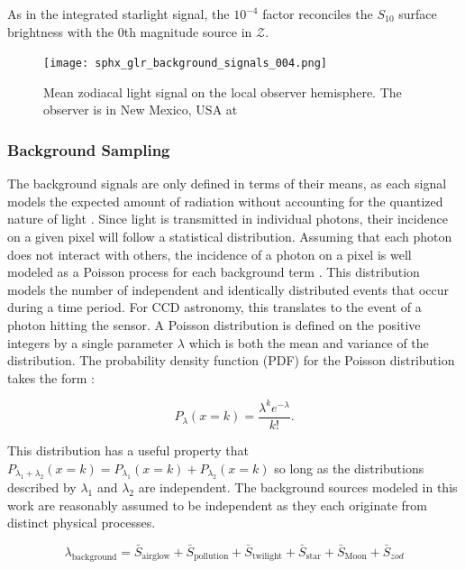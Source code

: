 As in the integrated starlight signal, the $10^{-4}$ factor reconciles the $S_{10}$ surface brightness with the 0th magnitude source in $\mathcal{Z}$. 

\begin{figure}[ht]
  \centering
  \texttt{[image: sphx\_glr\_background\_signals\_004.png]}
  \caption{Mean zodiacal light signal on the local observer hemisphere. The observer is in New Mexico, USA at
  \pogslla}
  \label{fig:zod_hemi}
\end{figure}

\subsubsection{Background Sampling}

The background signals are only defined in terms of their means, as each signal models the expected amount of radiation without accounting for the quantized nature of light \cite{krag2003}. Since light is transmitted in individual photons, their incidence on a given pixel will follow a statistical distribution. Assuming that each photon does not interact with others, the incidence of a photon on a pixel is well modeled as a Poisson process for each background term \cite{frueh2019notes}. This distribution models the number of independent and identically distributed events that occur during a time period. For CCD astronomy, this translates to the event of a photon hitting the sensor. A Poisson distribution is defined on the positive integers by a single parameter $\lambda$ which is both the mean and variance of the distribution. The probability density function (PDF) for the Poisson distribution takes the form \cite{frueh2019notes}:

\begin{equation} \label{eq:poisson_pdf}
  P_\lambda(x=k) = \frac{\lambda^k e^{-\lambda}}{k!}.
\end{equation}

This distribution has a useful property that $P_{\lambda_1 + \lambda_2}(x=k) = P_{\lambda_1}(x=k) + P_{\lambda_2}(x=k)$ so long as the distributions described by $\lambda_1$ and $\lambda_2$ are independent. The background sources modeled in this work are reasonably assumed to be independent as they each originate from distinct physical processes.

\begin{equation} \label{eq:background_poisson}
  \lambda_\mathrm{background} = \bar{S}_\mathrm{airglow} + \bar{S}_\mathrm{pollution} + \bar{S}_\mathrm{twilight} + \bar{S}_\mathrm{star} + \bar{S}_\mathrm{Moon} + \bar{S}_{zod}
\end{equation}


